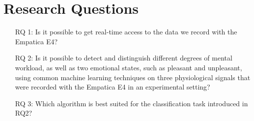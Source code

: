 \section{Research Questions}
\begin{center}
\begin{enumerate}
\item[RQ 1:] Is it possible to get real-time access to the data we record with the Empatica E4?
\item[RQ 2:] Is it possible to detect and distinguish different degrees of mental workload, as well as two emotional states, such as pleasant and unpleasant, using common machine learning techniques on three physiological signals that were recorded with the Empatica E4 in an experimental setting?
\item[RQ 3:] Which algorithm is best suited for the classification task introduced in RQ2?
\end{enumerate}
\end{center}

